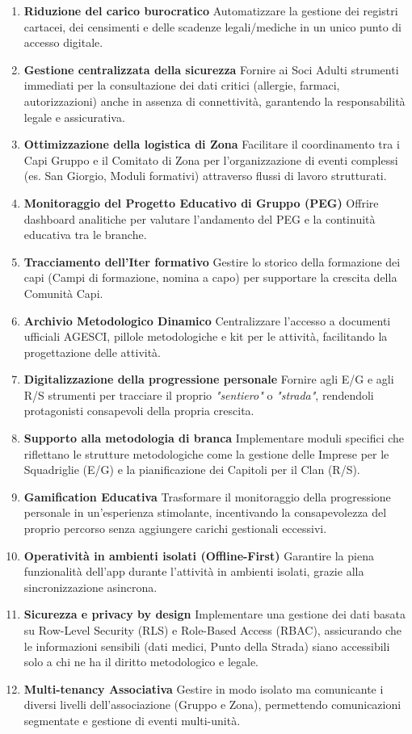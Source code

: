 \documentclass[11pt]{article}
\numberwithin{figure}{section}
\begin{document}
\begin{enumerate}
  \item \textbf{Riduzione del carico burocratico}
  Automatizzare la gestione dei registri cartacei, dei censimenti e delle scadenze legali/mediche in un unico punto di accesso digitale.
  \item \textbf{Gestione centralizzata della sicurezza}
  Fornire ai Soci Adulti strumenti immediati per la consultazione dei dati critici (allergie, farmaci, autorizzazioni) anche in assenza di connettività, garantendo la responsabilità legale e assicurativa.
  \item \textbf{Ottimizzazione della logistica di Zona}
  Facilitare il coordinamento tra i Capi Gruppo e il Comitato di Zona per l'organizzazione di eventi complessi (es. San Giorgio, Moduli formativi) attraverso flussi di lavoro strutturati.
  \item \textbf{Monitoraggio del Progetto Educativo di Gruppo (PEG)}
  Offrire dashboard analitiche per valutare l'andamento del PEG e la continuità educativa tra le branche.
  \item \textbf{Tracciamento dell'Iter formativo}
  Gestire lo storico della formazione dei capi (Campi di formazione, nomina a capo) per supportare la crescita della Comunità Capi.
  \item \textbf{Archivio Metodologico Dinamico}
  Centralizzare l'accesso a documenti ufficiali AGESCI, pillole metodologiche e kit per le attività, facilitando la progettazione delle attività.
  \item \textbf{Digitalizzazione della progressione personale}
  Fornire agli E/G e agli R/S strumenti per tracciare il proprio \textit{"sentiero"} o \textit{"strada"}, rendendoli protagonisti consapevoli della propria crescita.
  \item \textbf{Supporto alla metodologia di branca}
  Implementare moduli specifici che riflettano le strutture metodologiche come la gestione delle Imprese per le Squadriglie (E/G) e la pianificazione dei Capitoli per il Clan (R/S).
  \item \textbf{Gamification Educativa}
  Trasformare il monitoraggio della progressione personale in un'esperienza stimolante, incentivando la consapevolezza del proprio percorso senza aggiungere carichi gestionali eccessivi.
  \item \textbf{Operatività in ambienti isolati (Offline-First)}
  Garantire la piena funzionalità dell'app durante l'attività in ambienti isolati, grazie alla sincronizzazione asincrona.
  \item \textbf{Sicurezza e privacy by design}
  Implementare una gestione dei dati basata su Row-Level Security (RLS) e Role-Based Access (RBAC), assicurando che le informazioni sensibili (dati medici, Punto della Strada) siano accessibili solo a chi ne ha il diritto metodologico e legale.
  \item \textbf{Multi-tenancy Associativa}
  Gestire in modo isolato ma comunicante i diversi livelli dell'associazione (Gruppo e Zona), permettendo comunicazioni segmentate e gestione di eventi multi-unità.
\end{enumerate}
\end{document}
